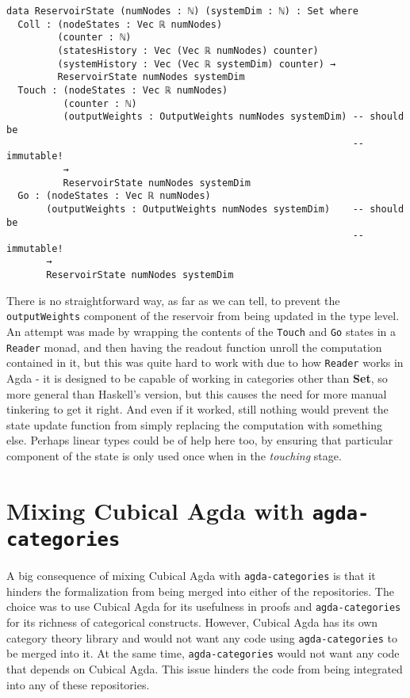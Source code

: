 \begin{verbatim}
data ReservoirState (numNodes : ℕ) (systemDim : ℕ) : Set where
  Coll : (nodeStates : Vec ℝ numNodes)
         (counter : ℕ)
         (statesHistory : Vec (Vec ℝ numNodes) counter) 
         (systemHistory : Vec (Vec ℝ systemDim) counter) → 
         ReservoirState numNodes systemDim
  Touch : (nodeStates : Vec ℝ numNodes)
          (counter : ℕ)
          (outputWeights : OutputWeights numNodes systemDim) -- should be
                                                             -- immutable!
          →
          ReservoirState numNodes systemDim
  Go : (nodeStates : Vec ℝ numNodes)
       (outputWeights : OutputWeights numNodes systemDim)    -- should be
                                                             -- immutable!
       →
       ReservoirState numNodes systemDim
\end{verbatim}

There is no straightforward way, as far as we can tell, to prevent the \texttt{outputWeights} component of the reservoir from being updated in the type level. An attempt was made by wrapping the contents of the \texttt{Touch} and \texttt{Go} states in a \texttt{Reader} monad, and then having the readout function unroll the computation contained in it, but this was quite hard to work with due to how \texttt{Reader} works in Agda - it is designed to be capable of working in categories other than \textbf{Set}, so more general than Haskell's version, but this causes the need for more manual tinkering to get it right. And even if it worked, still nothing would prevent the state update function from simply replacing the computation with something else. Perhaps linear types could be of help here too, by ensuring that particular component of the state is only used once when in the \textit{touching} stage.

\section{Mixing Cubical Agda with \texttt{agda-categories}}
A big consequence of mixing Cubical Agda with \texttt{agda-categories} is that it hinders the formalization from being merged into either of the repositories.
The choice was to use Cubical Agda for its usefulness in proofs and \texttt{agda-categories} for its richness of categorical constructs.
However, Cubical Agda has its own category theory library and would not want any code using \texttt{agda-categories} to be merged into it.
At the same time, \texttt{agda-categories} would not want any code that depends on Cubical Agda. This issue hinders the code from being integrated into any of these repositories.

